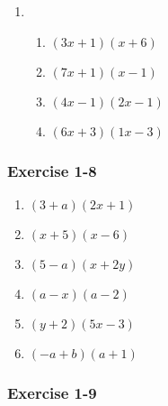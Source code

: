 {\begin{multicols}{3}
\begin{enumerate}[noitemsep, label=\textbf{\arabic*}. ]
\item %

\begin{enumerate}[noitemsep, label=\textbf{(\alph*)} ] 
\item $(3x + 1)(x + 6)$%
\item $(7x + 1)(x - 1)$%
\item $(4x - 1)(2x - 1)$%
\item $(6x + 3)(1x - 3)$%
\end{enumerate}

\end{enumerate}


\subsubsection*{Exercise 1-8} %


\begin{enumerate}[noitemsep, label=\textbf{\arabic*}. ] 
\item $(3 + a)(2x + 1)$%
\item $(x + 5)(x - 6)$%
\item $(5 - a)(x + 2y)$%
\item $(a - x)(a - 2)$%
\item $(y + 2)(5x - 3)$%
\item $(-a + b)(a + 1)$%
\end{enumerate}


\subsubsection*{Exercise 1-9} %



\end{multicols}}
